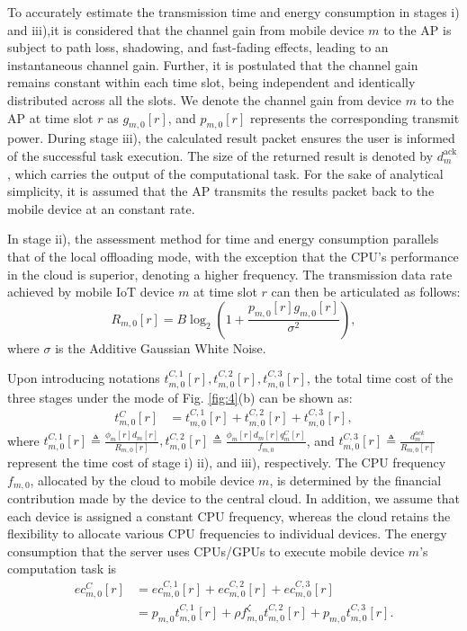 \documentclass[journal]{IEEEtran}
\begin{document}
To accurately estimate the transmission time and energy consumption in stages i) and iii),it is considered that the channel gain from mobile device $m$ to the AP is subject to path loss, shadowing, and fast-fading effects, leading to an instantaneous channel gain. Further, it is postulated that the channel gain remains constant within each time slot, being independent and identically distributed across all the slots. We denote the channel gain from device $m$ to the AP at time slot $r$ as $g_{m,0}[r]$, and $p_{m,0}[r]$ represents the corresponding transmit power.
During stage iii), the calculated result packet ensures the user is informed of the successful task execution. The size of the returned result is denoted by $d_m^{\text{ack}}$, which carries the output of the computational task.
For the sake of analytical simplicity, it is assumed that the AP transmits the results packet back to the mobile device at an constant rate.

In stage ii), the assessment method for time and energy consumption parallels that of the local offloading mode, with the exception that the CPU's performance in the cloud is superior, denoting a higher frequency. The transmission data rate achieved by mobile IoT device $m$ at time slot $r$ can then be articulated as follows:
\begin{equation}\label{eq:2}
R_{m,0}[r]=B\log_2{\left(1+\frac{p_{m,0}[r]g_{m,0}[r]}{\sigma^2}\right)},
\end{equation}
where $\sigma$ is the Additive Gaussian White Noise.

Upon introducing notations $t_{m,0}^{C,1}[r], t_{m,0}^{C,2}[r], t_{m,0}^{C,3}[r]$, the total time cost of the three stages under the mode of Fig. \ref{fig:4}(b) can be shown as:
\begin{align}\label{eq:3}
t_{m,0}^C[r]&=t_{m,0}^{C,1}[r]+t_{m,0}^{C,2}[r]+t_{m,0}^{C,3}[r],
\end{align}
where $t_{m,0}^{C,1}[r]\triangleq\frac{\phi_m[r]d_m[r]}{R_{m,0}[r]}, t_{m,0}^{C,2}[r]\triangleq \frac{\phi_m[r]d_m[r]q_m^C[r]}{f_{m,0}}$, and $t_{m,0}^{C,3}[r]\triangleq \frac{d_m^{ack}}{R_{m,0}[r]}$ represent the time cost of stage i) ii), and iii), respectively.
The CPU frequency $f_{m,0}$, allocated by the cloud to mobile device $m$, is determined by the financial contribution made by the device to the central cloud.
In addition, we assume that each device is assigned a constant CPU frequency, whereas the cloud retains the flexibility to allocate various CPU frequencies to individual devices.
The energy consumption that the server uses CPUs/GPUs to execute mobile device $m$'s computation task is
	\begin{align}\label{eq:4}
		ec_{m,0}^C[r]&=ec_{m,0}^{C,1}[r]+ec_{m,0}^{C,2}[r]+ec_{m,0}^{C,3}[r]\\
		&=p_{m,0}t_{m,0}^{C,1}[r]+\rho f_{m,0}^\zeta t_{m,0}^{C,2}[r]+p_{m,0}t_{m,0}^{C,3}[r].\nonumber
	\end{align}
\end{document}
